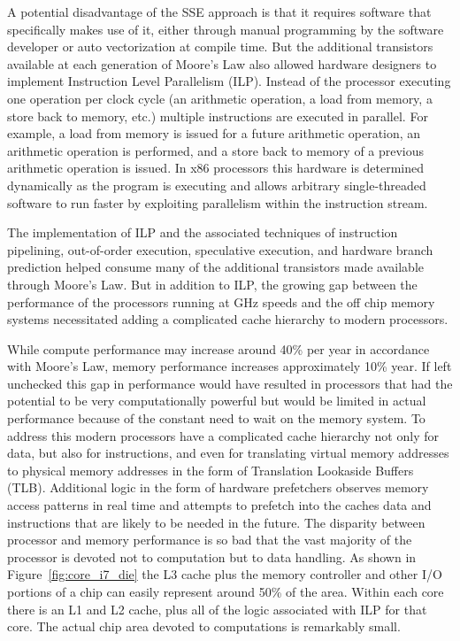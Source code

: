\documentclass{JINST}
\begin{document}
A potential disadvantage of the SSE approach is that it requires software that specifically makes use of it, either through manual programming by the software developer or auto vectorization at compile time.  But the additional transistors available at each generation of Moore's Law also allowed hardware designers to implement Instruction Level Parallelism (ILP).  Instead of the processor executing one operation per clock cycle (an arithmetic operation, a load from memory, a store back to memory, etc.) multiple instructions are executed in parallel.  For example, a load from memory is issued for a future arithmetic operation, an arithmetic operation is performed, and a store back to memory of a previous arithmetic operation is issued.  In x86 processors this hardware is determined dynamically as the program is executing and allows arbitrary single-threaded software to run faster by exploiting parallelism within the instruction stream.

The implementation of ILP and the associated techniques of instruction pipelining, out-of-order execution, speculative execution, and hardware branch prediction helped consume many of the additional transistors made available through Moore's Law.  But in addition to ILP, the growing gap between the performance of the processors running at GHz speeds and the off chip memory systems necessitated adding a complicated cache hierarchy to modern processors.

While compute performance may increase around 40\% per year in accordance with Moore's Law, memory performance increases approximately 10\% year.  If left unchecked this gap in performance would have resulted in processors that had the potential to be very computationally powerful but would be limited in actual performance because of the constant need to wait on the memory system.  To address this modern processors have a complicated cache hierarchy not only for data, but also for instructions, and even for translating virtual memory addresses to physical memory addresses in the form of Translation Lookaside Buffers (TLB).  Additional logic in the form of hardware prefetchers observes memory access patterns in real time and attempts to prefetch into the caches data and instructions that are likely to be needed in the future.  The disparity between processor and memory performance is so bad that the vast majority of the processor is devoted not to computation but to data handling.  As shown in Figure~\ref{fig:core_i7_die} the L3 cache plus the memory controller and other I/O portions of a chip can easily represent around 50\% of the area.  Within each core there is an L1 and L2 cache, plus all of the logic associated with ILP for that core.  The actual chip area devoted to computations is remarkably small.
\end{document}
